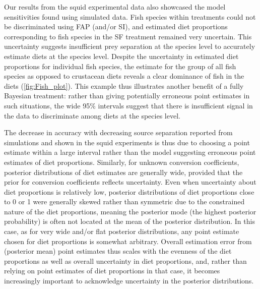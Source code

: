 \documentclass{article}%
\begin{document}
\begin{spacing}{1.9}
\begin{flushleft}
Our results from the squid experimental data also showcased the model
sensitivities found using simulated data. Fish species within treatments could
not be discriminated using FAP (and/or SI), and estimated diet
proportions corresponding to fish species in the SF treatment remained
very uncertain. This uncertainty suggests insufficient prey
separation at the species level to accurately estimate diets at the
species level. Despite the uncertainty in estimated diet proportions for
individual fish species, the estimate for the group of all
fish species as opposed to crustacean diets reveals a clear dominance of
fish in the diets (\autoref{fig:Fish_plot}). This example thus illustrates another
benefit of a fully Bayesian treatment: rather than giving
potentially erroneous point estimates in such situations, the wide
95\% intervals suggest that there is insufficient signal in the
data to discriminate among diets at the species level. 

The decrease in accuracy with decreasing source separation reported from simulations and shown in the
squid experiments is thus due to choosing a point estimate within a
large interval rather
than the model suggesting erroneous point estimates of diet proportions. Similarly, for unknown conversion coefficients, posterior
distributions of diet estimates are generally wide, provided that the
prior for conversion coefficients reflects uncertainty. Even when
uncertainty about diet proportions is relatively low, posterior distributions of diet proportions close to 0 or
1 were generally skewed rather than symmetric due to the constrained nature of the diet
proportions, meaning the posterior
mode (the highest posterior probability) is often not located at the
mean of the posterior distribution. In this case, as for very wide and/or flat
posterior distributions, any point estimate
chosen for diet proportions is somewhat arbitrary. Overall estimation error from (posterior mean) point
estimates thus scales with the evenness of the diet proportions as
well as overall uncertainty in diet proportions, and,
rather than relying on point estimates of diet proportions in that case,
it becomes increasingly important to acknowledge uncertainty in the
posterior distributions.


\end{flushleft}
\end{spacing}
\end{document}
